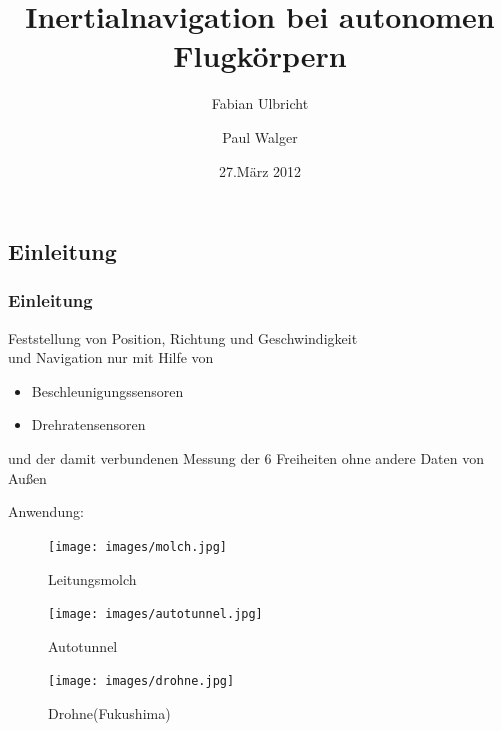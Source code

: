 \documentclass[10pt,a4paper,oneside]{beamer}
\title{Inertialnavigation bei autonomen Flugkörpern}
\author{
	Fabian Ulbricht \and
	Paul Walger 
}
\date[27.03.12]{27.März 2012}
\begin{document}
\frame{
	\titlepage
}


\begin{frame}
  \section{Einleitung}
  \frametitle{Einleitung}
  \begin{definition}[Inertialnavigation]
  Feststellung von Position, Richtung und Geschwindigkeit\\
  und Navigation nur mit Hilfe von
  \begin{itemize}
  \item Beschleunigungssensoren
  \item Drehratensensoren
  \end{itemize}
  und der damit verbundenen Messung der 6 Freiheiten ohne andere Daten von Außen
  \end{definition}
  Anwendung:
  \begin{figure}[htbp]
      \begin{minipage}{0.3\textwidth}
       \centering
        \texttt{[image: images/molch.jpg]}
        \caption{Leitungsmolch}
      \end{minipage}\hfill
      \begin{minipage}{0.3\textwidth}
       \centering
        \texttt{[image: images/autotunnel.jpg]}
        \caption{Autotunnel}
      \end{minipage}\hfill
      \begin{minipage}{0.3\textwidth}
       \centering
        \texttt{[image: images/drohne.jpg]}
        \caption{Drohne(Fukushima)}
      \end{minipage}
    \end{figure}
\end{frame}
\end{document}
